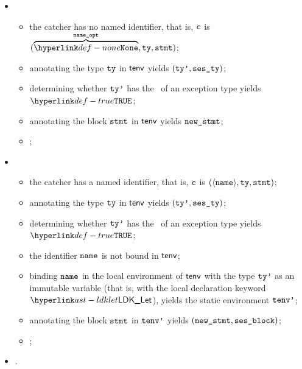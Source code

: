 \ProseParagraph
\OneApplies
\begin{itemize}
  \item {}
  \begin{itemize}
    \item the catcher has no named identifier, that is, $\texttt{c}$ is $(\overname{\None}{\nameopt}, \tty, \vstmt)$;
    \item annotating the type $\texttt{ty}$ in $\textsf{tenv}$ yields $(\texttt{ty'}, \texttt{ses\_ty})$\ProseOrTypeError;
    \item determining whether $\texttt{ty'}$ has the \structure\ of an exception type yields \\ $\True$\ProseOrTypeError;
    \item annotating the block $\texttt{stmt}$ in $\textsf{tenv}$ yields $\texttt{new\_stmt}$;
    \item \Proseeqdef{$\newcatcher$}{$(\overname{\None}{\nameopt}, \ttyp, \newstmt)$};
  \end{itemize}

  \item {}
  \begin{itemize}
    \item the catcher has a named identifier, that is, $\texttt{c}$ is $(\langle\texttt{name}\rangle, \texttt{ty}, \texttt{stmt})$;
    \item annotating the type $\texttt{ty}$ in $\textsf{tenv}$ yields $(\texttt{ty'}, \texttt{ses\_ty})$\ProseOrTypeError;
    \item determining whether $\texttt{ty'}$ has the \structure\ of an exception type yields \\ $\True$\ProseOrTypeError;
    \item the identifier $\texttt{name}$ is not bound in $\textsf{tenv}$;
    \item binding $\texttt{name}$ in the local environment of $\textsf{tenv}$ with the type $\texttt{ty'}$ as an immutable variable
          (that is, with the local declaration keyword $\LDKLet$), yields the static environment $\texttt{tenv'}$;
    \item annotating the block $\texttt{stmt}$ in $\texttt{tenv'}$ yields $(\texttt{new\_stmt}, \texttt{ses\_block})$;
    \item \Proseeqdef{$\newcatcher$}{$(\overname{\langle\name\rangle}{\nameopt}, \ttyp, \newstmt)$};
  \end{itemize}
  \item {}.
\end{itemize}

